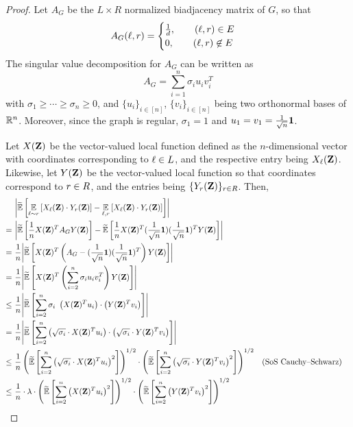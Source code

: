\begin{proof}
    Let $A_G$ be the $L \times R$ normalized biadjacency matrix of $G$, so that
    \[
    	A_G({ \ell },{ r }) = \begin{cases}
    		\frac{1}{d}, \qquad ({ \ell },{ r }) \in E \\
    		0, \qquad ({ \ell },{ r })\not\in E
    	\end{cases}
    \]
    The singular value decomposition for $A_G$ can be written as
    \[
    	A_G = \sum_{i=1}^n \sigma_i u_i v_i^T
    \]
    with $\sigma_1 \geq \cdots \geq \sigma_n \geq 0$, and $\{u_i\}_{i\in [n]}$, $\{v_i\}_{i \in [n]}$ being two orthonormal bases of ${\mathbb R}^n$. Moreover, since the graph is regular, $\sigma_1 =1$ and $u_1 = v_1 = \frac{1}{\sqrt{n}} {\mathbf{1}}$.
    
    Let $X({ \mathbf{Z} })$ be the vector-valued local function defined as the $n$-dimensional vector with coordinates corresponding to ${ \ell } \in L$, and the respective entry being $X_{{ \ell }}({ \mathbf{Z} })$. Likewise, let $Y({ \mathbf{Z} })$ be the vector-valued local function so that coordinates correspond to ${ r }\in R$, and the entries being $\{Y_{{ r }}({ \mathbf{Z} })\}_{{ r }\in R}$. Then,
%
    \begin{align*}
    	&\abs*{\tildeEx{\Ex{\li\sim \ri}{X_{\li}(\zee) \cdot Y_{\ri}(\zee)} - \Ex{\li,\ri}{X_{\li}(\zee) \cdot Y_{\ri}(\zee)}}} \\
    	=~ &\abs*{ \tildeEx{\frac{1}{n} X(\zee)^T A_G Y(\zee)} - \tildeEx{\frac{1}{n} X(\zee)^T (\frac{1}{\sqrt{n}} \one) (\frac{1}{\sqrt{n}} \one)^T Y(\zee)}} \\
    	=~ &\frac{1}{n} \abs*{\tildeEx{X(\zee)^T \inparen{A_G - (\frac{1}{\sqrt{n}} \one) (\frac{1}{\sqrt{n}} \one)^T}Y(\zee)}} \\
    	=~ &\frac{1}{n} \abs*{\tildeEx{X(\zee)^T \inparen{\sum_
    	{i=2}^n \sigma_i u_iv_i^T}Y(\zee)}} \\
    	\leq~ &\frac{1}{n} \abs*{\tildeEx{\sum_{i=2}^n \sigma_i ~ \inparen{X(\zee)^T u_i}\cdot \inparen{Y(\zee)^T v_i}}} \\
    	=~ &\frac{1}{n} \abs*{\tildeEx{\sum_{i=2}^n \inparen{\sqrt{\sigma_i} \cdot X(\zee)^T u_i}\cdot \inparen{\sqrt{\sigma_i}\cdot Y(\zee)^T v_i}}} \\
    	\leq~ &\frac{1}{n} \inparen{\tildeEx{\sum_{i=2}^n \inparen{\sqrt{\sigma_i} \cdot X(\zee)^T u_i}^2}}^{1/2} \cdot \inparen{\tildeEx{\sum_{i=2}^n \inparen{\sqrt{\sigma_i}\cdot Y(\zee)^T v_i}^2}}^{1/2} && (\text{{SoS Cauchy--Schwarz}})\\
    	\leq~ &\frac{1}{n}\cdot \lambda \cdot \inparen{\tildeEx{\sum_{i=2}^n \inparen{ X(\zee)^T u_i}^2}}^{1/2} \cdot \inparen{\tildeEx{\sum_{i=2}^n \inparen{ Y(\zee)^T v_i}^2}}^{1/2} \\

\end{align*}
\end{proof}
